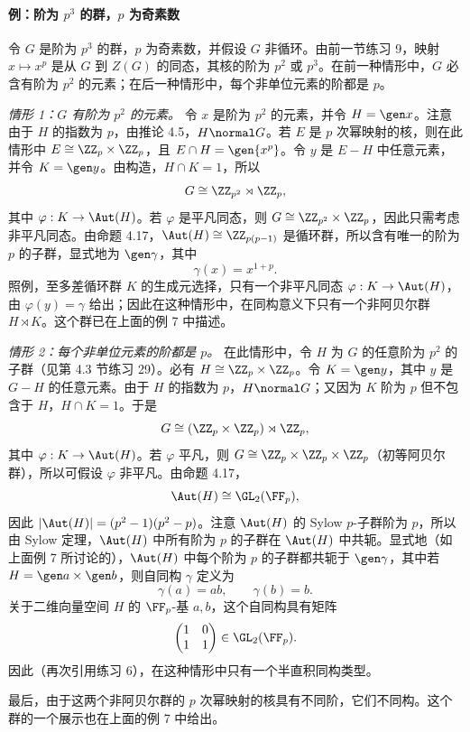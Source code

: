 \paragraph{例：阶为 $p^3$ 的群，$p$ 为奇素数}
令 $G$ 是阶为 $p^3$ 的群，$p$ 为奇素数，并假设 $G$ 非循环。由前一节练习 9，映射 $x\mapsto x^p$ 是从 $G$ 到 $Z(G)$ 的同态，其核的阶为 $p^2$ 或 $p^3$。在前一种情形中，$G$ 必含有阶为 $p^2$ 的元素；在后一种情形中，每个非单位元素的阶都是 $p$。

\emph{情形 1：$G$ 有阶为 $p^2$ 的元素。}
令 $x$ 是阶为 $p^2$ 的元素，并令 $H=\gen x$。注意由于 $H$ 的指数为 $p$，由推论 4.5，$H\normal G$。若 $E$ 是 $p$ 次幂映射的核，则在此情形中 $E\cong\ZZ_p\times\ZZ_p$，且 $E\cap H=\gen{x^p}$。令 $y$ 是 $E-H$ 中任意元素，并令 $K=\gen y$。由构造，$H\cap K=1$，所以
\[
  G\cong \ZZ_{p^2}\rtimes\ZZ_p,
\]
其中 $\varphi:K\to\Aut(H)$。若 $\varphi$ 是平凡同态，则 $G\cong\ZZ_{p^2}\times\ZZ_p$，因此只需考虑非平凡同态。由命题 4.17，$\Aut(H)\cong\ZZ_{p(p-1)}$ 是循环群，所以含有唯一的阶为 $p$ 的子群，显式地为 $\gen\gamma$，其中
\[
  \gamma(x)=x^{1+p}.
\]
照例，至多差循环群 $K$ 的生成元选择，只有一个非平凡同态 $\varphi:K\to\Aut(H)$，由 $\varphi(y)=\gamma$ 给出；因此在这种情形中，在同构意义下只有一个非阿贝尔群 $H\rtimes K$。这个群已在上面的例 7 中描述。

\emph{情形 2：每个非单位元素的阶都是 $p$。}
在此情形中，令 $H$ 为 $G$ 的任意阶为 $p^2$ 的子群（见第 4.3 节练习 29）。必有 $H\cong\ZZ_p\times\ZZ_p$。令 $K=\gen y$，其中 $y$ 是 $G-H$ 的任意元素。由于 $H$ 的指数为 $p$，$H\normal G$；又因为 $K$ 阶为 $p$ 但不包含于 $H$，$H\cap K=1$。于是
\[
  G\cong(\ZZ_p\times\ZZ_p)\rtimes\ZZ_p,
\]
其中 $\varphi:K\to\Aut(H)$。若 $\varphi$ 平凡，则 $G\cong\ZZ_p\times\ZZ_p\times\ZZ_p$（初等阿贝尔群），所以可假设 $\varphi$ 非平凡。由命题 4.17，
\[
  \Aut(H)\cong\GL_2(\FF_p),
\]
因此 $|\Aut(H)|=(p^2-1)(p^2-p)$。注意 $\Aut(H)$ 的 Sylow $p$-子群阶为 $p$，所以由 Sylow 定理，$\Aut(H)$ 中所有阶为 $p$ 的子群在 $\Aut(H)$ 中共轭。显式地（如上面例 7 所讨论的），$\Aut(H)$ 中每个阶为 $p$ 的子群都共轭于 $\gen\gamma$，其中若 $H=\gen a\times\gen b$，则自同构 $\gamma$ 定义为
\[
  \gamma(a)=ab,
  \qquad
  \gamma(b)=b.
\]
关于二维向量空间 $H$ 的 $\FF_p$-基 $a,b$，这个自同构具有矩阵
\[
  \begin{pmatrix}1&0\\1&1\end{pmatrix}\in\GL_2(\FF_p).
\]
因此（再次引用练习 6），在这种情形中只有一个半直积同构类型。

最后，由于这两个非阿贝尔群的 $p$ 次幂映射的核具有不同阶，它们不同构。这个群的一个展示也在上面的例 7 中给出。

